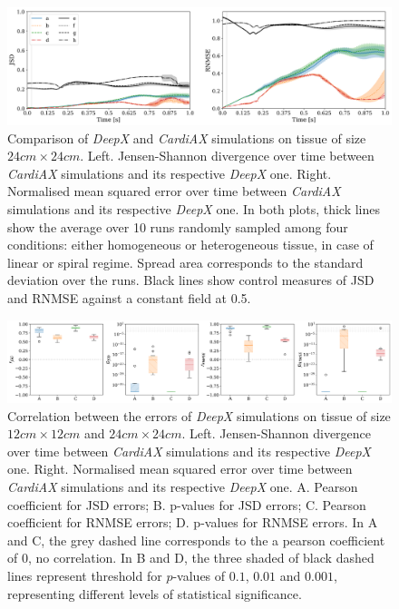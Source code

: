 \documentclass[utf8]{frontiersSCNS} %
\begin{document}
\begin{figure}[!htp]
\centering
\includegraphics[width=\textwidth]{Figure-13.png}
\caption{Comparison of \textit{DeepX} and \textit{CardiAX} simulations on tissue of size $24cm \times 24cm$. Left. Jensen-Shannon divergence over time between \textit{CardiAX} simulations and its respective \textit{DeepX} one. Right. Normalised mean squared error over time between \textit{CardiAX} simulations and its respective \textit{DeepX} one.
In both plots, thick lines show the average over 10 runs randomly sampled among four conditions: either homogeneous or heterogeneous tissue, in case of linear or spiral regime. Spread area corresponds to the standard deviation over the runs. 
Black lines show control measures of JSD and RNMSE against a constant field at 0.5.
}
\label{fig:13}
\end{figure}

\begin{figure}[!htp]
\centering
\includegraphics[width=\textwidth]{Figure-14.png}
\caption{Correlation between the errors of \textit{DeepX} simulations on tissue of size $12cm \times 12cm$ and $24cm \times 24cm$. Left. Jensen-Shannon divergence over time between \textit{CardiAX} simulations and its respective \textit{DeepX} one. Right. Normalised mean squared error over time between \textit{CardiAX} simulations and its respective \textit{DeepX} one. A. Pearson coefficient for JSD errors; B. p-values for JSD errors; C. Pearson coefficient for RNMSE errors; D. p-values for RNMSE errors.
In A and C, the grey dashed line corresponds to the a pearson coefficient of 0, no correlation. In B and D, the three shaded of black dashed lines represent threshold for $p$-values of $0.1$, $0.01$ and $0.001$, representing different levels of statistical significance.
}
\label{fig:14}
\end{figure}
\end{document}
